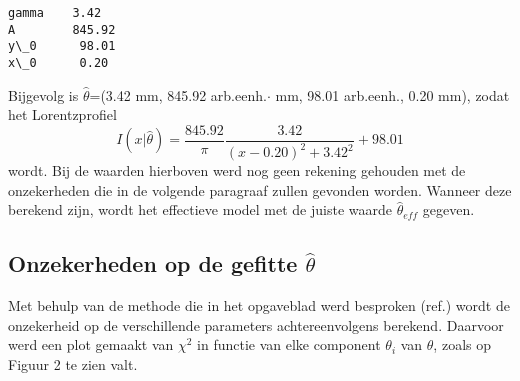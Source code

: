 \documentclass[11pt]{article}
\begin{document}
    \begin{Verbatim}[commandchars=\\\{\}]
gamma    3.42
A        845.92
y\_0      98.01
x\_0      0.20
    \end{Verbatim}

    Bijgevolg is \(\hat{ \theta}\)=(3.42 mm, 845.92 arb.eenh.\(\cdot\) mm,
98.01 arb.eenh., 0.20 mm), zodat het Lorentzprofiel
\[I(x \vert \hat{ \theta})= \frac{845.92}{ \pi} \frac{3.42}{(x-0.20)^2+3.42^2}+98.01\]
wordt. Bij de waarden hierboven werd nog geen rekening gehouden met de
onzekerheden die in de volgende paragraaf zullen gevonden worden.
Wanneer deze berekend zijn, wordt het effectieve model met de juiste
waarde \(\hat{\theta}_{eff}\) gegeven.

    \hypertarget{onzekerheden-op-de-gefitte-hattheta}{%
\subsection{\texorpdfstring{Onzekerheden op de gefitte
\(\hat{\theta}\)}{Onzekerheden op de gefitte \textbackslash hat\{\textbackslash theta\}}}\label{onzekerheden-op-de-gefitte-hattheta}}

    Met behulp van de methode die in het opgaveblad werd besproken (ref.)
wordt de onzekerheid op de verschillende parameters achtereenvolgens
berekend. Daarvoor werd een plot gemaakt van \(\chi^2\) in functie van
elke component \(\theta_i\) van \(\theta\), zoals op Figuur 2 te zien
valt.
\end{document}
